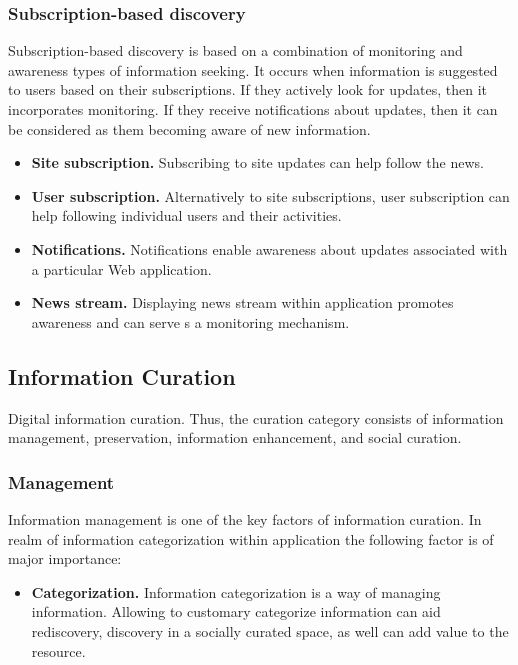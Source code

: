 \documentclass{casconpaper}
\begin{document}
{\subsubsection{Subscription-based discovery}
Subscription-based discovery is based on a combination of monitoring and awareness types of information seeking. It occurs when information is suggested to users based on their subscriptions. If they actively look for updates, then it incorporates monitoring. If they receive notifications about updates, then it can be considered as them becoming aware of new information. 

\begin{itemize}
  \item \textbf{Site subscription.} Subscribing to site updates can help follow the news.
  \item \textbf{User subscription.} Alternatively to site subscriptions, user subscription can help following individual users and their activities.
  \item \textbf{Notifications.} Notifications enable awareness about updates associated with a particular Web application. 
  \item \textbf{News stream.} Displaying news stream within application promotes awareness and can serve s a monitoring mechanism.
\end{itemize}
} %

{\subsection{Information Curation}
Digital information curation. Thus, the curation category consists of information management, preservation, information enhancement, and social curation.  
} %

{\subsubsection{Management}
Information management is one of the key factors of information curation. In realm of information categorization within application the following factor is of major importance:
\begin{itemize}
  \item \textbf{Categorization.} Information categorization is a way of managing information. Allowing to customary categorize information can aid rediscovery, discovery in a socially curated space, as well can add value to the resource.
\end{itemize}
} %
\end{document}
